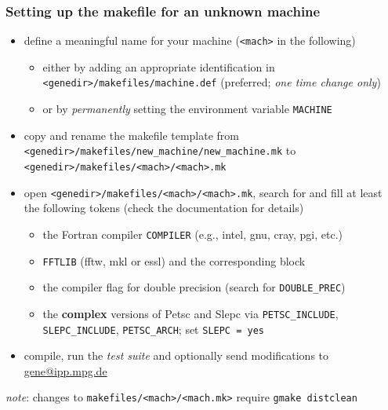 \documentclass[10pt]{beamer}
\begin{document}


\begin{frame}
  \frametitle{Setting up the makefile for an unknown machine}

\begin{block}{}
 \begin{itemize}
  \item define a meaningful name for your machine ({\tt <mach>} in the following)
\begin{itemize}
 \item either by adding an appropriate identification in {\tt <genedir>/makefiles/machine.def} (preferred; {\em one time change only}) 
 \item or by {\em permanently} setting the environment variable {\tt MACHINE}
\end{itemize}
 \item copy and rename the makefile template from {\tt \small <genedir>/makefiles/new\_machine/new\_machine.mk} to {\tt \small <genedir>/makefiles/<mach>/<mach>.mk}
 \item open {\tt \small <genedir>/makefiles/<mach>/<mach>.mk}, search for and fill at least the following tokens (check the documentation for details)
\begin{itemize}
\item the Fortran compiler {\tt COMPILER} (e.g., intel, gnu, cray, pgi, etc.)
\item {\tt FFTLIB} (fftw, mkl or essl) and the corresponding block
\item the compiler flag for double precision (search for {\tt DOUBLE\_PREC})
\item the {\bf complex} versions of {\sc Petsc} and {\sc Slepc} via {\tt PETSC\_INCLUDE}, {\tt SLEPC\_INCLUDE}, {\tt PETSC\_ARCH}; set {\tt SLEPC = yes}
\end{itemize}
 \item compile, run the {\em test suite} and optionally send modifications to \href{mailto:gene@ipp.mpg.de}{gene@ipp.mpg.de}
 \end{itemize}
\end{block}
\vspace{-1ex}
\begin{alertblock}{}
{\em note}: changes to {\tt \small makefiles/<mach>/<mach.mk>} require {\tt gmake distclean}
\end{alertblock}



\end{frame}
\end{document}
